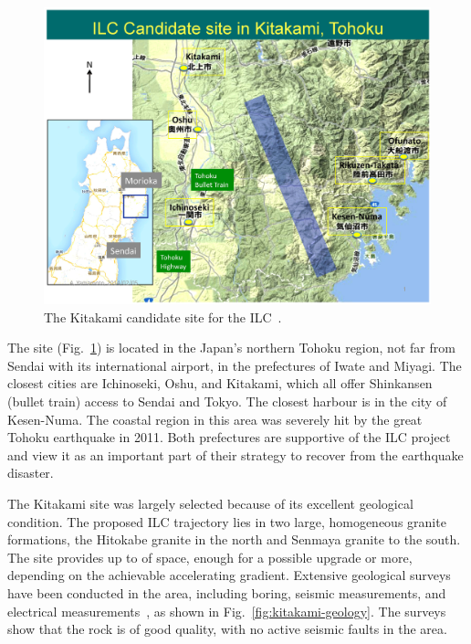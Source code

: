 \begin{figure}[htbp]
   \includegraphics[width=\hsize]{chapters/figures/ILC-Candidate-Area2}
\caption{The Kitakami candidate site for the ILC~\cite{Warmbein:2014a}.}
\label{fig:kitakami-site}
\end{figure}

The site (Fig.~\ref{fig:kitakami-site}) is located in the Japan's northern Tohoku region, not far from Sendai with its international airport, in the prefectures of Iwate and Miyagi.
The closest cities are Ichinoseki, Oshu, and Kitakami, which all offer Shinkansen (bullet train) access to Sendai and Tokyo.
The closest harbour is in the city of Kesen-Numa.
The coastal region in this area was severely hit by the great Tohoku earthquake in 2011. 
Both prefectures are supportive of the ILC project and view it as an important part of their strategy to recover from the earthquake disaster.

The Kitakami site was largely selected because of its excellent geological condition. 
The proposed ILC trajectory lies in two large, homogeneous granite formations, the Hitokabe granite in the north and Senmaya granite to the south.
The site provides up to  of space, enough for a possible  upgrade or more, depending on the achievable accelerating gradient.  
Extensive geological surveys have been conducted in the area, including boring, seismic measurements, and electrical measurements~\cite{Sanuki:2015a}, as shown in Fig.~\ref{fig:kitakami-geology}.
The surveys show that the rock is of good quality, with no active seismic faults in the area.

